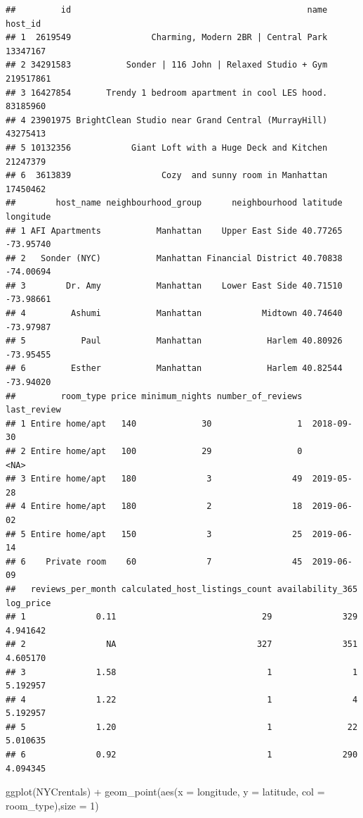\documentclass[
]{article}
\newenvironment{Shaded}{\begin{snugshade}}{\end{snugshade}}
\newcommand{\AttributeTok}[1]{\textcolor[rgb]{0.77,0.63,0.00}{#1}}
\newcommand{\DecValTok}[1]{\textcolor[rgb]{0.00,0.00,0.81}{#1}}
\newcommand{\FunctionTok}[1]{\textcolor[rgb]{0.00,0.00,0.00}{#1}}
\newcommand{\NormalTok}[1]{#1}
\newcommand{\SpecialCharTok}[1]{\textcolor[rgb]{0.00,0.00,0.00}{#1}}
\begin{document}
\begin{verbatim}
##         id                                               name   host_id
## 1  2619549                Charming, Modern 2BR | Central Park  13347167
## 2 34291583           Sonder | 116 John | Relaxed Studio + Gym 219517861
## 3 16427854       Trendy 1 bedroom apartment in cool LES hood.  83185960
## 4 23901975 BrightClean Studio near Grand Central (MurrayHill)  43275413
## 5 10132356            Giant Loft with a Huge Deck and Kitchen  21247379
## 6  3613839                  Cozy  and sunny room in Manhattan  17450462
##        host_name neighbourhood_group      neighbourhood latitude longitude
## 1 AFI Apartments           Manhattan    Upper East Side 40.77265 -73.95740
## 2   Sonder (NYC)           Manhattan Financial District 40.70838 -74.00694
## 3        Dr. Amy           Manhattan    Lower East Side 40.71510 -73.98661
## 4         Ashumi           Manhattan            Midtown 40.74640 -73.97987
## 5           Paul           Manhattan             Harlem 40.80926 -73.95455
## 6         Esther           Manhattan             Harlem 40.82544 -73.94020
##         room_type price minimum_nights number_of_reviews last_review
## 1 Entire home/apt   140             30                 1  2018-09-30
## 2 Entire home/apt   100             29                 0        <NA>
## 3 Entire home/apt   180              3                49  2019-05-28
## 4 Entire home/apt   180              2                18  2019-06-02
## 5 Entire home/apt   150              3                25  2019-06-14
## 6    Private room    60              7                45  2019-06-09
##   reviews_per_month calculated_host_listings_count availability_365 log_price
## 1              0.11                             29              329  4.941642
## 2                NA                            327              351  4.605170
## 3              1.58                              1                1  5.192957
## 4              1.22                              1                4  5.192957
## 5              1.20                              1               22  5.010635
## 6              0.92                              1              290  4.094345
\end{verbatim}

\begin{Shaded}
\begin{Highlighting}[]
\FunctionTok{ggplot}\NormalTok{(NYCrentals) }\SpecialCharTok{+}
  \FunctionTok{geom\_point}\NormalTok{(}\FunctionTok{aes}\NormalTok{(}\AttributeTok{x =}\NormalTok{ longitude, }\AttributeTok{y =}\NormalTok{ latitude, }\AttributeTok{col =}\NormalTok{ room\_type),}\AttributeTok{size =} \DecValTok{1}\NormalTok{)}
\end{Highlighting}
\end{Shaded}
\end{document}
